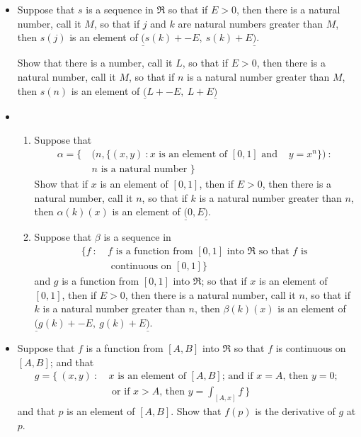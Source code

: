 \documentclass{article}
\begin{document}
\begin{itemize}

  \item[1.] Suppose that $s$ is a sequence in $\Re$ so that if $E > 0$, then there is a natural number, call it $M$, so that if $j$ and $k$ are natural numbers greater than $M$, then $s(j)$ is an element of $\underline{(} s(k) + -E, \ s(k) + E \underline{)}$.
  
    Show that there is a number, call it $L$, so that if $E > 0$, then there is a natural number, call it $M$, so that if $n$ is a natural number greater than $M$, then $s(n)$ is an element of $\underline{(} L + -E, \ L + E \underline{)}$

\hspace{0.5cm}

  \item[2.] $\ $
    \begin{enumerate}[\hspace{1cm}(a.)]

      \item Suppose that 
        \begin{align*}
        \alpha = \{ \ & (n, \{ (x,y)\ : x \text{ is an element of $[0,1]$ and } & y = x^n \} ) \ : \ \\
                      & n \text{ is a natural number } \} 
        \end{align*}
        Show that if $x$ is an element of $[0,1]$, then if $E > 0$, then there is a natural number, call it $n$, so that if $k$ is a natural number greater than $n$, then $\alpha(k)(x)$ is an element of $\underline{(} 0,E \underline{)}$.
      
      \item Suppose that $\beta$ is a sequence in 
        \begin{align*}
        \{ f \ : \ & f \text{ is a function from $[0,1]$ into $\Re$ so that $f$ is } \\
                   & \text{ continuous on } [0,1] \}
        \end{align*}
        and $g$ is a function from $[0,1]$ into $\Re$; so that if $x$ is an element of $[0,1]$, then if $E > 0$, then there is a natural number, call it $n$, so that if $k$ is a natural number greater than $n$, then $\beta(k)(x)$ is an element of $\underline{(} g(k) + -E, \ g(k) + E \underline{)}$.
      
    \end{enumerate}

  \item[3.] Suppose that $f$ is a function from $[A,B]$ into $\Re$ so that $f$ is continuous on $[A,B]$; and that 
    \begin{align*}
    g = \{ \ (x,y)\ :\ & x \text{ is an element of $[A,B]$; and if $x = A$, then $y = 0$; } \\
                       & \text{ or if $x > A$, then } y = \int_{[A,x]} f \ \}
    \end{align*}
    and that $p$ is an element of $[A,B]$. Show that $f(p)$ is the derivative of $g$ at $p$.
  
\end{itemize}
\end{document}
